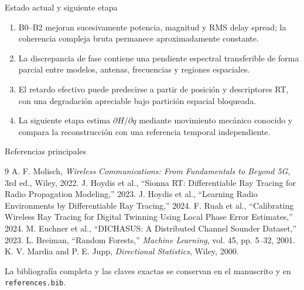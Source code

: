 \documentclass[10pt,aspectratio=169]{beamer}
\begin{document}
\begin{frame}{Estado actual y siguiente etapa}
\small
\begin{enumerate}
\setlength\itemsep{0.34cm}
\item B0--B2 mejoran sucesivamente potencia, magnitud y RMS delay spread; la
coherencia compleja bruta permanece aproximadamente constante.
\item La discrepancia de fase contiene una pendiente espectral transferible de forma
parcial entre modelos, antenas, frecuencias y regiones espaciales.
\item El retardo efectivo puede predecirse a partir de posición y descriptores RT,
con una degradación apreciable bajo partición espacial bloqueada.
\item La siguiente etapa estima $\partial H/\partial q$ mediante movimiento mecánico
conocido y compara la reconstrucción con una referencia temporal independiente.
\end{enumerate}
\end{frame}

\begin{frame}{Referencias principales}
\footnotesize
\begin{thebibliography}{9}
A. F. Molisch, \emph{Wireless Communications: From Fundamentals to Beyond 5G}, 3rd ed., Wiley, 2022.
J. Hoydis et al., ``Sionna RT: Differentiable Ray Tracing for Radio Propagation Modeling,'' 2023.
J. Hoydis et al., ``Learning Radio Environments by Differentiable Ray Tracing,'' 2024.
F. Ruah et al., ``Calibrating Wireless Ray Tracing for Digital Twinning Using Local Phase Error Estimates,'' 2024.
M. Euchner et al., ``DICHASUS: A Distributed Channel Sounder Dataset,'' 2023.
L. Breiman, ``Random Forests,'' \emph{Machine Learning}, vol. 45, pp. 5--32, 2001.
K. V. Mardia and P. E. Jupp, \emph{Directional Statistics}, Wiley, 2000.
\end{thebibliography}
\vspace{0.15cm}
La bibliografía completa y las claves exactas se conservan en el manuscrito y en
\texttt{references.bib}.
\end{frame}
\end{document}
